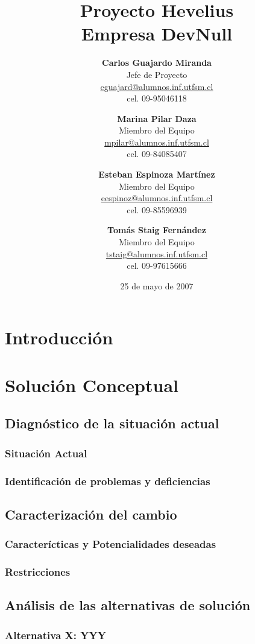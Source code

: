 \documentclass[letterpaper,spanish,10pt]{article}
\title{{\Huge \bf Proyecto Hevelius} \\ {\Large Empresa DevNull} \\ {\small <tipo informe>}}
\author{
{\bf Carlos Guajardo Miranda} \\ Jefe de Proyecto \\ \url{cguajard@alumnos.inf.utfsm.cl} \\ cel. 09-95046118 
\and
{\bf Marina Pilar Daza} \\ Miembro del Equipo \\ \url{mpilar@alumnos.inf.utfsm.cl} \\ cel. 09-84085407
\and
{\bf Esteban Espinoza Mart\'inez} \\ Miembro del Equipo \\ \url{eespinoz@alumnos.inf.utfsm.cl} \\ cel. 09-85596939
\and
{\bf Tom\'as Staig Fern\'andez} \\ Miembro del Equipo \\ \url{tstaig@alumnos.inf.utfsm.cl} \\ cel. 09-97615666
}
\date{25 de mayo de 2007}
\begin{document}
\maketitle


%
%
\newpage

\section{Introducci\'on}



\section{Soluci\'on Conceptual}
\subsection{Diagn\'ostico de la situaci\'on actual}
\subsubsection{Situaci\'on Actual}



\subsubsection{Identificaci\'on de problemas y deficiencias}



\subsection{Caracterizaci\'on del cambio}
\subsubsection{Caracter\'icticas y Potencialidades deseadas}



\subsubsection{Restricciones}



\subsection{An\'alisis de las alternativas de soluci\'on}
\subsubsection{Alternativa X: YYY}
\end{document}
